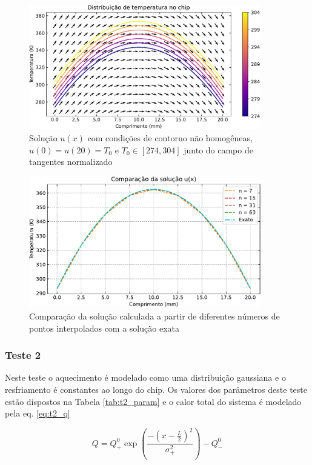 \documentclass[a4,12pt]{horizon-theme}
\begin{document}
\begin{figure}[!ht]
  \centering
  \includegraphics[width=0.9\textwidth]{../plots/test_1.pdf}
  \caption{Solução $u(x)$ com condições de contorno não homogêneas, $u(0) = u(20) = T_0$ e $T_0 \in [274, 304]$ junto do campo de tangentes normalizado}
  \label{fig:t1}
\end{figure}

\begin{figure}[!ht]
  \centering
  \includegraphics[width=0.9\textwidth]{../plots/test_1_comp.pdf}
  \caption{Comparação da solução calculada a partir de diferentes números de pontos interpolados com a solução exata}
  \label{fig:t1_comp}
\end{figure}

\newpage
\subsubsection{Teste 2}
Neste teste o aquecimento é modelado como uma distribuição gaussiana e o resfriamento é constantes ao longo do chip. Os valores dos parâmetros deste teste estão dispostos na Tabela \ref{tab:t2_param} e o calor total do sistema é modelado pela eq. \eqref{eq:t2_q}

\begin{equation}\label{eq:t2_q}
  Q = Q^0_+\exp\left(\frac{-\left(x-\frac{L}{2}\right)^2}{\sigma_+ ^2}\right) - Q^0_-
\end{equation}
\end{document}
